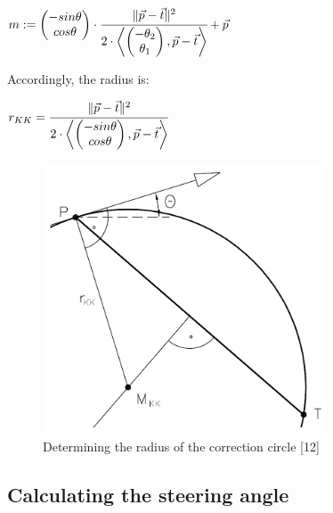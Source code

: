 \begin{center}
$m:=
	\begin{pmatrix}
		-sin \theta \\
		cos \theta
	\end{pmatrix}
	\cdot
	\cfrac{\| \vec{p} - \vec{t} \|^2}{2 \cdot \left \langle 
	\begin{pmatrix}
		- \theta_2 \\
		\theta_1
	\end{pmatrix}
	, \vec{p} - \vec{t}
	\right \rangle
	} + \vec{p}
$
\end{center}

Accordingly, the radius is:

\begin{center}
$ r_{KK}=
\cfrac{\| \vec{p} - \vec{t} \|^2}{2 \cdot \left \langle 
	\begin{pmatrix}
		-sin \theta \\
		cos \theta
	\end{pmatrix}
	, \vec{p} - \vec{t}
	\right \rangle
	}$
\end{center}

\begin{figure}[h]
\centering
\includegraphics[width=0.75\textwidth]{./Chapters/Figures/correction_circle_radius.png}
\caption{Determining the radius of the correction circle [12] \label{pic:correction_circle_radius}}
\end{figure}

\subsection{Calculating the steering angle}
\label{sec:calculating_steering_angle}

